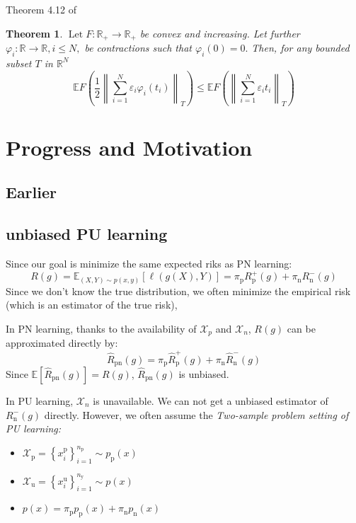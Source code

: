 \documentclass[12pt]{article}
\newtheorem{thm}{Theorem}[section]
\theoremstyle{definition}
\begin{document}
Theorem 4.12 of \cite{ledoux2013probability}
\begin{thm}
	$\operatorname{Let} F: \mathbb{R}_{+} \rightarrow \mathbb{R}_{+}$ be convex and increasing. Let further
	$\varphi_{i}: \mathbb{R} \rightarrow \mathbb{R}, i \leq N,$ be contractions such that $\varphi_{i}(0)=0 .$ Then, for any bounded subset $T$ in $\mathbb{R}^{N}$
	\[
	\mathbb{E} F\left(\frac{1}{2}\left\|\sum_{i=1}^{N} \varepsilon_{i} \varphi_{i}\left(t_{i}\right)\right\|_{T}\right) \leq \mathbb{E} F\left(\left\|\sum_{i=1}^{N} \varepsilon_{i} t_{i}\right\|_{T}\right)
	\]
\end{thm}

\section{Progress and Motivation}
\subsection{Earlier}
\subsection{unbiased PU learning}
Since our goal is minimize the same expected riks as PN learning:
$$
R(g)=\mathbb{E}_{(X, Y) \sim p(x, y)}[\ell(g(X), Y)]=\pi_{\mathrm{p}} R_{\mathrm{p}}^{+}(g)+\pi_{\mathrm{n}} R_{\mathrm{n}}^{-}(g)
$$
Since we don't know the true distribution, we often minimize the empirical risk (which is an estimator of the true risk), 

In PN learning, thanks to the availability of $\mathcal{X}_p$ and $\mathcal{X}_n$, $R(g)$ can be approximated directly by:
\begin{equation}
	\widehat{R}_{\mathrm{pn}}(g)=\pi_{\mathrm{p}} \widehat{R}_{\mathrm{p}}^{+}(g)+\pi_{\mathrm{n}} \widehat{R}_{\mathrm{n}}^{-}(g)
\end{equation}
Since $\mathbb{E}[\widehat{R}_{\mathrm{pn}}(g)]=R(g)$, $\widehat{R}_{\mathrm{pn}}(g)$ is unbiased.

In PU learning, $\mathcal{X}_n$ is unavailable. We can not get a unbiased estimator of $R_{\mathrm{n}}^{-}(g)$ directly.  However, we often assume the \emph{Two-sample problem setting of PU learning:}

\begin{itemize}
	\item $\mathcal{X}_{\mathrm{p}}=\left\{x_{i}^{\mathrm{p}}\right\}_{i=1}^{n_{\mathrm{p}}} \sim p_{\mathrm{p}}(x)$
	
	\item $\mathcal{X}_{\mathrm{u}}=\left\{x_{i}^{\mathrm{u}}\right\}_{i=1}^{n_{\mathrm{y}}} \sim p(x)$
	
	\item $p(x) = \pi_\mathrm{p}p_\mathrm{p}(x) + \pi_\mathrm{n}p_\mathrm{n}(x)$
\end{itemize}
\end{document}
